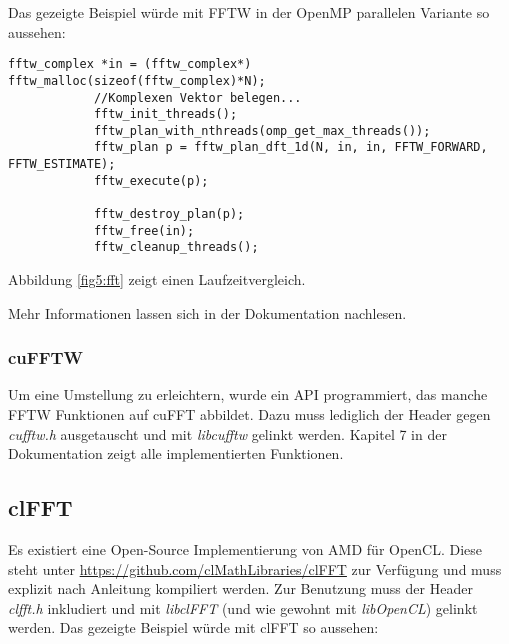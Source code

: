 		 	Das gezeigte Beispiel würde mit FFTW in der OpenMP parallelen Variante so aussehen:
		 	\begin{lstlisting}[caption=FFTW Beispiel] 
		 	fftw_complex *in = (fftw_complex*) fftw_malloc(sizeof(fftw_complex)*N);
		 	//Komplexen Vektor belegen...
			fftw_init_threads();
			fftw_plan_with_nthreads(omp_get_max_threads());	
			fftw_plan p = fftw_plan_dft_1d(N, in, in, FFTW_FORWARD, FFTW_ESTIMATE); 
			fftw_execute(p); 
			
			fftw_destroy_plan(p);
			fftw_free(in);
			fftw_cleanup_threads();	 	
		 	\end{lstlisting}
		 	
			Abbildung \ref{fig5:fft} zeigt einen Laufzeitvergleich.
		
			Mehr Informationen lassen sich in der Dokumentation nachlesen. \autocite{fftwDoc}
			
			\subsubsection{cuFFTW}
			Um eine Umstellung zu erleichtern, wurde ein \Gls{API} programmiert, das manche FFTW Funktionen auf cuFFT abbildet. Dazu muss lediglich der Header gegen \textit{cufftw.h} ausgetauscht und mit \textit{libcufftw} gelinkt werden. Kapitel 7 in der Dokumentation zeigt alle implementierten Funktionen. \autocite{cufftDoc}		
			
		\subsection{clFFT}
		Es existiert eine Open-Source Implementierung von AMD für OpenCL. Diese steht unter \url{https://github.com/clMathLibraries/clFFT} zur Verfügung und muss explizit nach Anleitung kompiliert werden. Zur Benutzung muss der Header \textit{clfft.h} inkludiert und mit \textit{libclFFT} (und wie gewohnt mit \textit{libOpenCL}) gelinkt werden. Das gezeigte Beispiel würde mit clFFT so aussehen:
		
		\newpage
		
